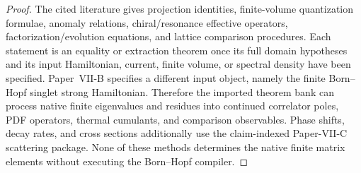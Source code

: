 \documentclass[12pt,a4paper]{article}
\begin{document}
\begin{proof}
The cited literature gives projection identities, finite-volume quantization
formulae, anomaly relations, chiral/resonance effective operators,
factorization/evolution equations, and lattice comparison procedures.  Each
statement is an equality or extraction theorem once its full domain hypotheses
and its input Hamiltonian, current, finite volume, or spectral density have
been specified.  Paper~VII-B specifies a different input object, namely the finite
Born--Hopf singlet strong Hamiltonian.  Therefore the imported theorem bank can
process native finite eigenvalues and residues into continued correlator poles,
PDF operators, thermal cumulants, and comparison observables.  Phase shifts,
decay rates, and cross sections additionally use the claim-indexed Paper-VII-C
scattering package.  None of these methods determines the native finite matrix
elements without executing the Born--Hopf compiler.
\end{proof}
\end{document}
